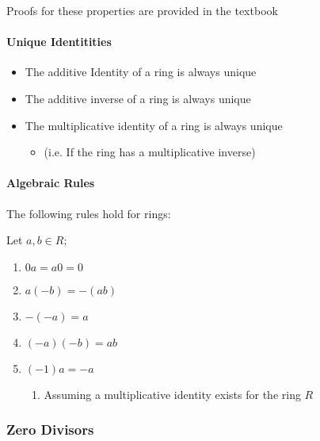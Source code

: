 \documentclass[
]{article}
\begin{document}
\begin{enumerate}
  Proofs for these properties are provided in the textbook

  \hypertarget{header-n782}{%
  \paragraph{Unique Identitities}\label{header-n782}}

  \begin{itemize}
  \item
    The additive Identity of a ring is always unique
  \item
    The additive inverse of a ring is always unique
  \item
    The multiplicative identity of a ring is always unique

    \begin{itemize}
    \item
      (i.e. If the ring has a multiplicative inverse)
    \end{itemize}
  \end{itemize}

  \hypertarget{header-n793}{%
  \paragraph{Algebraic Rules}\label{header-n793}}

  The following rules hold for rings:

  Let \(a, b \in R\);

  \begin{enumerate}
  \def\labelenumii{\arabic{enumii}.}
  \item
    \(0a = a0 =0\)
  \item
    \(a(-b)=-(ab)\)
  \item
    \(-(-a)=a\)
  \item
    \((-a)(-b) = ab\)
  \item
    \((-1)a=-a\)

    \begin{enumerate}
    \def\labelenumiii{\arabic{enumiii}.}
    \item
      Assuming a multiplicative identity exists for the ring \(R\)
    \end{enumerate}
  \end{enumerate}

  \hypertarget{header-n811}{%
  \subsubsection{Zero Divisors}\label{header-n811}}


\end{enumerate}
\end{document}

